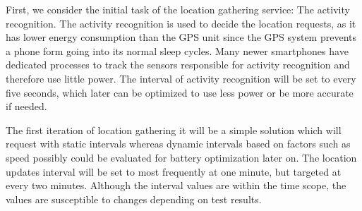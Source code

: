 First, we consider the initial task of the location gathering service: The activity recognition.
The activity recognition is used to decide the location requests, as it has lower energy consumption than the GPS unit \cite{fuckGPS} since the GPS system prevents a phone form going into its normal sleep cycles.
Many newer smartphones \cite{coCPU} have dedicated processes to track the sensors responsible for activity recognition and therefore use little power.
The interval of activity recognition will be set to every five seconds, which later can be optimized to use less power or be more accurate if needed.

The first iteration of location gathering it will be a simple solution which will request with static intervals whereas dynamic intervals based on factors such as speed possibly could be evaluated for battery optimization later on.
The location updates interval will be set to most frequently at one minute, but targeted at every two minutes.
Although the interval values are within the time scope, the values are susceptible to changes depending on test results.

